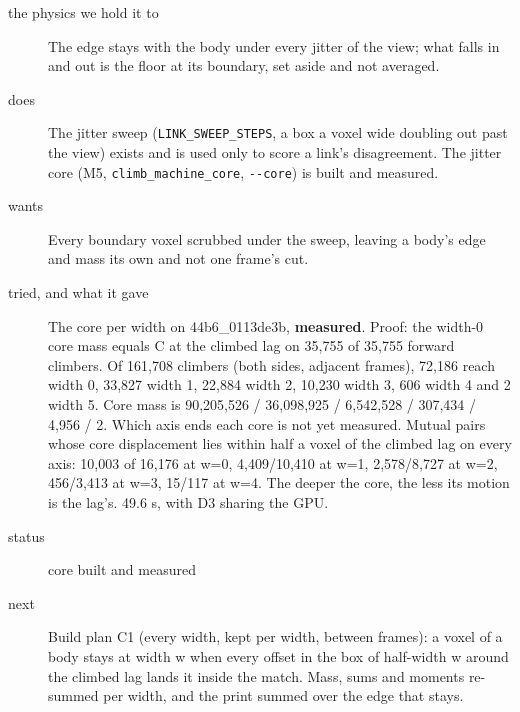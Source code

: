 \begin{description}
\item[{the physics we hold it to}] The edge stays with the body under every jitter of the view; what falls in and out is the floor at its boundary, set aside and not averaged.
\item[{does}] The jitter sweep (\texttt{LINK\_\allowbreak{}SWEEP\_\allowbreak{}STEPS}, a box a voxel wide doubling out past the view) exists and is used only to score a link's disagreement. The jitter core (M5, \texttt{climb\_\allowbreak{}machine\_\allowbreak{}core}, \texttt{-\allowbreak{}-\allowbreak{}core}) is built and measured.
\item[{wants}] Every boundary voxel scrubbed under the sweep, leaving a body's edge and mass its own and not one frame's cut.
\item[{tried, and what it gave}] The core per width on 44b6\_\allowbreak{}0113de3b, \textbf{measured}. Proof: the width-0 core mass equals C at the climbed lag on 35,755 of 35,755 forward climbers. Of 161,708 climbers (both sides, adjacent frames), 72,186 reach width 0, 33,827 width 1, 22,884 width 2, 10,230 width 3, 606 width 4 and 2 width 5. Core mass is 90,205,526 / 36,098,925 / 6,542,528 / 307,434 / 4,956 / 2. Which axis ends each core is not yet measured. Mutual pairs whose core displacement lies within half a voxel of the climbed lag on every axis: 10,003 of 16,176 at w=0, 4,409/10,410 at w=1, 2,578/8,727 at w=2, 456/3,413 at w=3, 15/117 at w=4. The deeper the core, the less its motion is the lag's. 49.6 s, with D3 sharing the GPU.
\item[{status}] core built and measured
\item[{next}] Build plan C1 (every width, kept per width, between frames): a voxel of a body stays at width w when every offset in the box of half-width w around the climbed lag lands it inside the match. Mass, sums and moments re-summed per width, and the print summed over the edge that stays.
\end{description}

